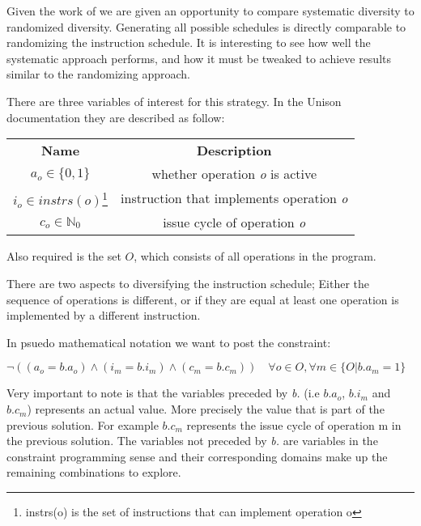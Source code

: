 Given the work of \textcite{large-scale-automated} we are given an opportunity to compare
systematic diversity to randomized diversity. Generating all possible schedules is directly
comparable to randomizing the instruction schedule. It is interesting to see how well
the systematic approach performs, and how it must be tweaked to achieve results similar
to the randomizing approach.

There are three variables of interest for this strategy. In the Unison documentation
they are described as follow:

\vspace{0.2cm}

\begin{tabular}{cc}
	\textbf{Name} & \textbf{Description} \\
	$a_o \in \{0, 1\}$ & whether operation \textit{o} is active \\
	$i_o \in instrs(o)$\footnote{instrs(o) is the set of instructions that can implement operation o} & instruction that implements operation \textit{o}  \\
	$c_o \in \mathbb{N}_0$ & issue cycle of operation \textit{o} \\
\end{tabular}

\vspace{0.2cm}

Also required is the set $O$, which consists of all operations in the program.

\vspace{0.2cm}

There are two aspects to diversifying the instruction schedule; Either the sequence of
operations is different, or if they are equal at least one operation is implemented by a
different instruction.

In psuedo mathematical notation we want to post the constraint:

\vspace{0.2cm}

$\neg( (a_o = b.a_o) \land (i_m = b.i_m) \land (c_m = b.c_m) ) \quad \forall o \in O, \forall m \in \{ O | b.a_m = 1 \}$

\vspace{0.2cm}

Very important to note is that the variables preceded by \textit{b.} (i.e $b.a_o$, $b.i_m$
and $b.c_m$) represents an actual value. More precisely the value that is part of the
previous solution. For example $b.c_m$ represents the issue cycle of operation m in the
previous solution. The variables not preceded by \textit{b.} are variables in the
constraint programming sense and their corresponding domains make up the remaining
combinations to explore.

